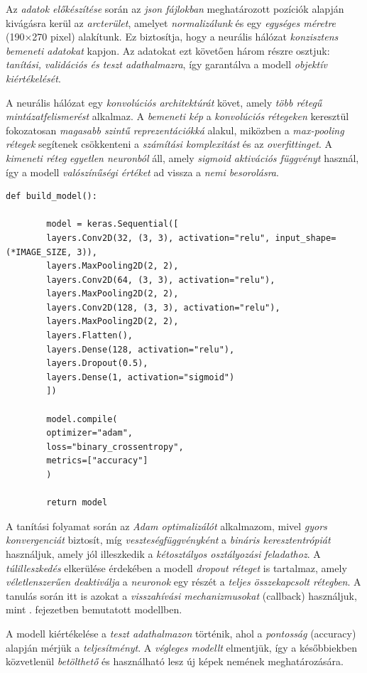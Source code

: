 \documentclass[
]{thesis-ekf}
\theoremstyle{definition}
\theoremstyle{remark}
\begin{document}
Az \emph{adatok előkészítése} során az \emph{json fájlokban} meghatározott pozíciók alapján kivágásra kerül az \emph{arcterület}, amelyet \emph{normalizálunk} és egy \emph{egységes méretre} (190×270 pixel) alakítunk. Ez biztosítja, hogy a neurális hálózat \emph{konzisztens bemeneti adatokat} kapjon. Az adatokat ezt követően három részre osztjuk: \emph{tanítási, validációs és teszt adathalmazra}, így garantálva a modell \emph{objektív kiértékelését}.

A neurális hálózat egy \emph{konvolúciós architektúrát} követ, amely \emph{több rétegű mintázatfelismerést} alkalmaz. A \emph{bemeneti kép} a \emph{konvolúciós rétegeken} keresztül fokozatosan \emph{magasabb szintű reprezentációkká} alakul, miközben a \emph{max-pooling rétegek} segítenek csökkenteni a \emph{számítási komplexitást} és az \emph{overfittinget}. A \emph{kimeneti réteg} \emph{egyetlen neuronból} áll, amely \emph{sigmoid aktivációs függvényt} használ, így a modell \emph{valószínűségi értéket} ad vissza a \emph{nemi besorolásra}.

\begin{lstlisting}[style=mypython, caption={Nemfelismerő modell}, label=kod-python7]
	def build_model():
	
		model = keras.Sequential([
		layers.Conv2D(32, (3, 3), activation="relu", input_shape=(*IMAGE_SIZE, 3)),
		layers.MaxPooling2D(2, 2),
		layers.Conv2D(64, (3, 3), activation="relu"),
		layers.MaxPooling2D(2, 2),
		layers.Conv2D(128, (3, 3), activation="relu"),
		layers.MaxPooling2D(2, 2),
		layers.Flatten(),
		layers.Dense(128, activation="relu"),
		layers.Dropout(0.5),
		layers.Dense(1, activation="sigmoid")
		])
		
		model.compile(
		optimizer="adam", 
		loss="binary_crossentropy", 
		metrics=["accuracy"]
		)
		
		return model
\end{lstlisting}
A tanítási folyamat során az \emph{Adam optimalizálót} alkalmazom, mivel \emph{gyors konvergenciát} biztosít, míg \emph{veszteségfüggvényként} a \emph{bináris keresztentrópiát} használjuk, amely jól illeszkedik a \emph{kétosztályos osztályozási feladathoz}. A \emph{túlilleszkedés} elkerülése érdekében a modell \emph{dropout réteget} is tartalmaz, amely \emph{véletlenszerűen deaktiválja} a \emph{neuronok} egy részét a \emph{teljes összekapcsolt rétegben}. A tanulás során itt is azokat a \emph{visszahívási mechanizmusokat} (callback) használjuk, mint . fejezetben bemutatott modellben.

A modell kiértékelése a \emph{teszt adathalmazon} történik, ahol a \emph{pontosság} (accuracy) alapján mérjük a \emph{teljesítményt}. A \emph{végleges modellt} elmentjük, így a későbbiekben közvetlenül \emph{betölthető} és használható lesz új képek nemének meghatározására.
\end{document}
